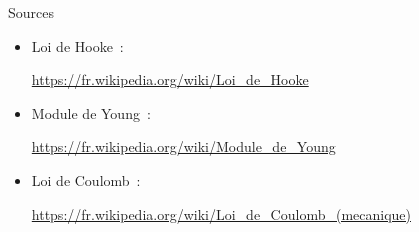 \documentclass{beamer}
\begin{document}
\begin{frame}{Sources}
\begin{scriptsize}
\begin{itemize}
      \item Loi de Hooke~:
	\begin{tiny}
	  \url{https://fr.wikipedia.org/wiki/Loi_de_Hooke}
	\end{tiny}
      \item Module de Young~:
	\begin{tiny}
	  \url{https://fr.wikipedia.org/wiki/Module_de_Young}
	\end{tiny}
      \item Loi de Coulomb~:
	\begin{tiny}
	  \url{https://fr.wikipedia.org/wiki/Loi_de_Coulomb_(mecanique)}
	\end{tiny}
  \end{itemize}
  \end{scriptsize}
\end{frame}
\end{document}
